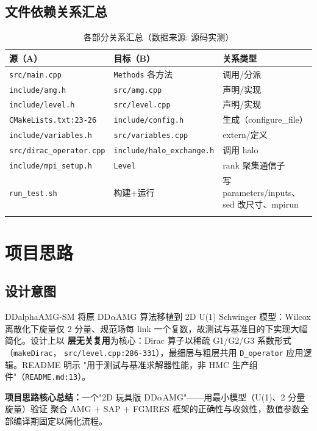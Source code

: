 \documentclass[UTF8]{ctexart}
\begin{document}
\subsection{文件依赖关系汇总}
\begin{xltabular}{\textwidth}{lXX}
\toprule
\textcolor{relation}{源（A）} & 目标（B） & 关系类型 \\
\midrule
\endhead
\texttt{\nolinkurl{src/main.cpp}} & \texttt{Methods} 各方法 & 调用/分派 \\
\texttt{\nolinkurl{include/amg.h}} & \texttt{\nolinkurl{src/amg.cpp}} & 声明/实现 \\
\texttt{\nolinkurl{include/level.h}} & \texttt{\nolinkurl{src/level.cpp}} & 声明/实现 \\
\texttt{CMakeLists.txt:23-26} & \texttt{include/config.h} & 生成（configure\_file）\\
\texttt{include/variables.h} & \texttt{\nolinkurl{src/variables.cpp}} & extern/定义 \\
\texttt{src/dirac\_operator.cpp} & \texttt{include/halo\_exchange.h} & 调用 halo \\
\texttt{\nolinkurl{include/mpi_setup.h}} & \texttt{Level} & rank 聚集通信子 \\
\texttt{run\_test.sh} & 构建+运行 & 写 parameters/inputs、sed 改尺寸、mpirun \\
\bottomrule
\caption{各部分关系汇总（数据来源: 源码实测）}
\end{xltabular}

\section{项目思路}

\subsection{设计意图}
DDalphaAMG-SM 将原 DD$\alpha$AMG 算法移植到 2D U(1) Schwinger 模型：Wilcox 离散化下旋量仅 2
分量、规范场每 link 一个复数，故测试与基准目的下实现大幅简化。设计上以
\textbf{层无关复用}为核心：Dirac 算子以稀疏 G1/G2/G3 系数形式（\texttt{makeDirac}，
\texttt{src/level.cpp:286-331}），最细层与粗层共用 \texttt{D\_operator} 应用逻辑。README 明示
"用于测试与基准求解器性能，非 HMC 生产组件"（\texttt{README.md:13}）。

\begin{ideabox}
\textbf{项目思路核心总结：}一个"2D 玩具版 DD$\alpha$AMG"——用最小模型（U(1)、2 分量旋量）验证
聚合 AMG + SAP + FGMRES 框架的正确性与收敛性，数值参数全部编译期固定以简化流程。
\end{ideabox}
\end{document}
